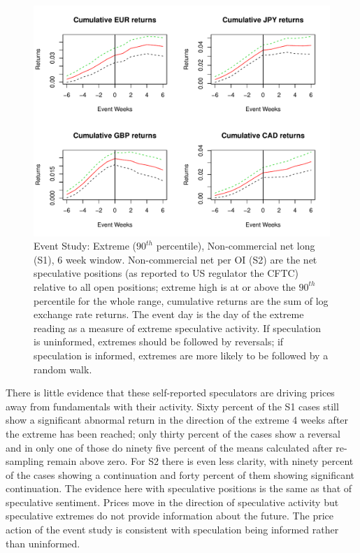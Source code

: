 \documentclass[preprint,12pt,authoryear]{elsarticle}
\begin{document}
\begin{figure}
\graphicspath{{../Figures/}}
\centering
\includegraphics[scale=0.8]{FPCum6wa}
\caption{Event Study:  Extreme ($90^{th}$ percentile), Non-commercial net long (S1), 6 week window. Non-commercial net per OI (S2) are the net speculative positions (as reported to US regulator the CFTC) relative to all open positions; extreme high is at or above the $90^{th}$ percentile for the whole range, cumulative returns are the sum of log exchange rate returns. The event day is the day of the extreme reading as a measure of extreme speculative activity.  If speculation is uninformed, extremes should be followed by reversals; if speculation is informed, extremes are more likely to be followed by a random walk.}
\label{fig:ES4}
\end{figure}

There is little evidence that these self-reported speculators are driving prices away from fundamentals with their activity. Sixty percent of the S1 cases still show a significant abnormal return in the direction of the extreme 4 weeks after the extreme has been reached; only thirty percent of the cases show a reversal and in only one of those do ninety five percent of the means calculated after re-sampling remain above zero.  For S2 there is even less clarity, with ninety percent of the cases showing a continuation and forty percent of them showing significant continuation.  The evidence here with speculative positions is the same as that of speculative sentiment.  Prices move in the direction of speculative activity but speculative extremes do not provide information about the future. The price action of the event study is consistent with speculation being informed rather than uninformed.     
\end{document}
